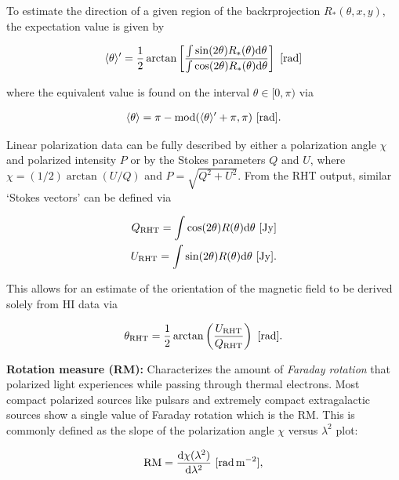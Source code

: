 \documentclass[a4paper,11pt]{article}
\begin{document}
{\noindent}To estimate the direction of a given region of the backrprojection $R_*(\theta,x,y)$, the expectation value is given by

\begin{align*}
    \langle\theta\rangle' = \frac{1}{2}\arctan \left[\frac{\int\sin(2\theta)R_*(\theta)\mathrm{d}\theta}{\int\cos(2\theta)R_*(\theta)\mathrm{d}\theta}\right] ~ [{\rm rad}]
\end{align*}

{\noindent}where the equivalent value is found on the interval $\theta\in[0,\pi)$ via

\begin{align*}
    \langle\theta\rangle = \pi - {\rm mod}(\langle\theta\rangle'+\pi,\pi) ~ [{\rm rad}].
\end{align*}

{\noindent}Linear polarization data can be fully described by either
a polarization angle $\chi$ and polarized intensity $P$ or by the Stokes parameters $Q$ and $U$, where $\chi=(1/2)\arctan(U/Q)$ and $P=\sqrt{Q^2+U^2}$. From the RHT output, similar `Stokes vectors' can be defined via

\begin{align*}
    Q_\mathrm{RHT} = \int\cos(2\theta)R(\theta)\mathrm{d}\theta ~ [{\rm Jy}] \\
    U_\mathrm{RHT} = \int\sin(2\theta)R(\theta)\mathrm{d}\theta ~ [{\rm Jy}].
\end{align*}

{\noindent}This allows for an estimate of the orientation of the magnetic field to be derived solely from HI data via

\begin{align*}
    \theta_\mathrm{RHT} = \frac{1}{2}\arctan\left(\frac{U_\mathrm{RHT}}{Q_\mathrm{RHT}}\right) ~ [{\rm rad}].
\end{align*}

{\noindent}\textbf{Rotation measure (RM):} Characterizes the amount of \textit{Faraday rotation} that polarized light experiences while passing through thermal electrons. Most compact polarized sources like pulsars and extremely compact extragalactic sources show a single value of Faraday rotation which is the RM. This is commonly defined as the slope of the polarization angle $\chi$ versus $\lambda^2$ plot:

\begin{align*}
    {\rm RM} = \frac{\mathrm{d}\chi(\lambda^2)}{\mathrm{d}\lambda^2} ~ [{\rm rad\,m^{-2}}],
\end{align*}
\end{document}
